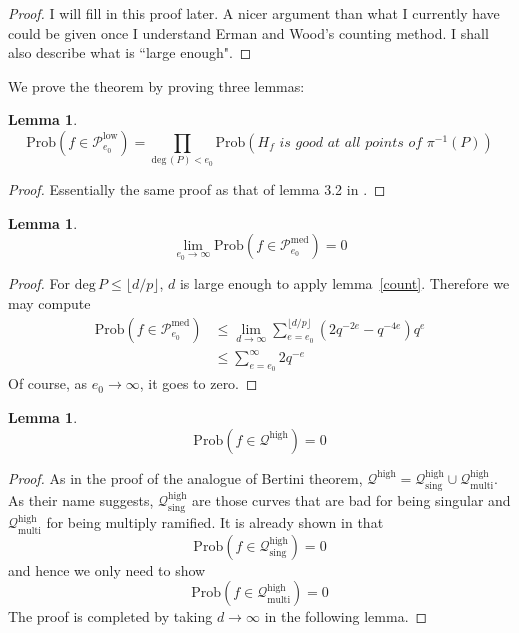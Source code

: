 \documentclass[12pt]{article}
\theoremstyle{plain}
\newtheorem{lemma}[equation]{Lemma}
\theoremstyle{definition}
\newcommand{\sP}{\mathcal{P}}
\newcommand{\sQ}{\mathcal{Q}}
\renewcommand{\deg}{\mathrm{deg}\,}
\newcommand{\<}{\langle}
\renewcommand{\>}{\rangle}
\newcommand{\Prob}{\mathrm{Prob}}
\begin{document}
\begin{proof}
I will fill in this proof later. A nicer argument than what I currently have could be given once I understand Erman and Wood's counting method. I shall also describe what is ``large enough". 
\end{proof}
We prove the theorem by proving three lemmas:
\begin{lemma}
$$\Prob(f \in \sP_{e_0}^{\mathrm{low}}) = \prod_{\deg(P) < e_0} \Prob(H_f \textit{ is good at all points of } \pi^{-1}(P))$$
\end{lemma}
\begin{proof}
Essentially the same proof as that of lemma 3.2 in \cite{Wood}. 
\end{proof}
\begin{lemma}
$$\lim_{e_0 \to \infty} \Prob(f \in \sP_{e_0}^{\mathrm{med}}) = 0$$
\end{lemma}
\begin{proof}
For $\deg P \le \lfloor d/p \rfloor$, $d$ is large enough to apply lemma~\ref{count}. Therefore we may compute 
\begin{align*}
\Prob( f \in \sP_{e_0}^{\mathrm{med}} ) &\le \lim_{d \to \infty} \sum_{e = e_0}^{ \lfloor d/p \rfloor } (2 q^{-2e} - q^{-4e}) q^e \\
&\le \sum_{e = e_0}^{\infty} 2q^{-e}
\end{align*}
Of course, as $e_0 \to \infty$, it goes to zero. 
\end{proof}
\begin{lemma}
$$\Prob( f \in \sQ^{\mathrm{high}}) = 0 $$
\end{lemma}
\begin{proof}
As in the proof of the analogue of Bertini theorem, $\sQ^{\mathrm{high}} = \sQ^{\mathrm{high}}_{\mathrm{sing}} \cup \sQ^{\mathrm{high}}_{\mathrm{multi}}$. As their name suggests, $\sQ^{\mathrm{high}}_{\mathrm{sing}}$ are those curves that are bad for being singular and $\sQ^{\mathrm{high}}_{\mathrm{multi}}$ for being multiply ramified. It is already shown in \cite{Wood} that $$ \Prob(f \in \sQ^{\mathrm{high}}_{\mathrm{sing}}) = 0 $$ and hence we only need to show
$$ \Prob(f \in \sQ^{\mathrm{high}}_{\mathrm{multi}}) = 0 $$
The proof is completed by taking $d \to \infty$ in the following lemma. 
\end{proof}
\end{document}
